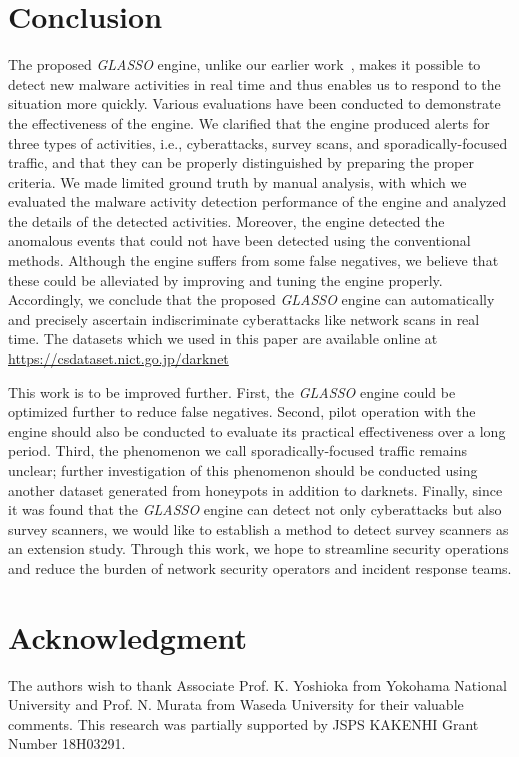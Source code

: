 \documentclass[conference]{IEEEtran}
\begin{document}
\section{Conclusion}
The proposed \textit{GLASSO} engine, unlike our earlier work~\cite{Han}, makes it possible to detect new malware activities in real time and thus enables us to respond to the situation more quickly.
Various evaluations have been conducted to demonstrate the effectiveness of the engine.
We clarified that the engine produced alerts for three types of activities, i.e., cyberattacks, survey scans, and sporadically-focused traffic, and that they can be properly distinguished by preparing the proper criteria.
We made limited ground truth by manual analysis, with which we evaluated the malware activity detection performance of the engine and analyzed the details of the detected activities.
Moreover, the engine detected the anomalous events that could not have been detected using the conventional methods.
Although the engine suffers from some false negatives, we believe that these could be alleviated by improving and tuning the engine properly.
Accordingly, we conclude that the proposed \textit{GLASSO} engine can automatically and precisely ascertain indiscriminate cyberattacks like network scans in real time.
The datasets which we used in this paper are available online at \url{https://csdataset.nict.go.jp/darknet}

This work is to be improved further.
First, the \textit{GLASSO} engine could be optimized further to reduce false negatives.
Second, pilot operation with the engine should also be conducted to evaluate its practical effectiveness over a long period.
Third, the phenomenon we call sporadically-focused traffic remains unclear; further investigation of this phenomenon should be conducted using another dataset generated from honeypots in addition to darknets.
Finally, since it was found that the \textit{GLASSO} engine can detect not only cyberattacks but also survey scanners, we would like to establish a method to detect survey scanners as an extension study.
Through this work, we hope to streamline security operations and reduce the burden of network security operators and incident response teams.




\section*{Acknowledgment}
The authors wish to thank Associate Prof. K. Yoshioka from Yokohama National University and  Prof. N. Murata from Waseda University for their valuable comments.
This research was partially supported by JSPS KAKENHI Grant Number 18H03291.
\end{document}
